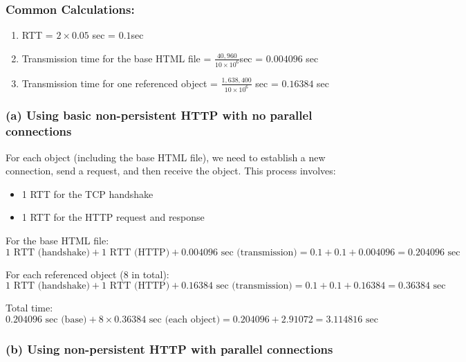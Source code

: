 \documentclass[
]{article}
\providecommand{\tightlist}{%
  \setlength{\itemsep}{0pt}\setlength{\parskip}{0pt}}
\begin{document}
\hypertarget{common-calculations}{%
\subsubsection{Common Calculations:}\label{common-calculations}}

\begin{enumerate}
\def\labelenumi{\arabic{enumi}.}
\tightlist
\item
  RTT = \(2 \times 0.05\) sec = \(0.1\)sec
\item
  Transmission time for the base HTML file =
  \(\frac{40,960}{10 \times 10^6}\)sec = \(0.004096\) sec
\item
  Transmission time for one referenced object =
  \(\frac{1,638,400}{10 \times 10^6}\) sec = \(0.16384\) sec
\end{enumerate}

\hypertarget{a-using-basic-non-persistent-http-with-no-parallel-connections}{%
\subsubsection{(a) Using basic non-persistent HTTP with no parallel
connections}\label{a-using-basic-non-persistent-http-with-no-parallel-connections}}

For each object (including the base HTML file), we need to establish a
new connection, send a request, and then receive the object. This
process involves:

\begin{itemize}
\tightlist
\item
  1 RTT for the TCP handshake
\item
  1 RTT for the HTTP request and response
\end{itemize}

For the base HTML file: \[
1 \text{ RTT (handshake)} + 1 \text{ RTT (HTTP)} + 0.004096 \text{ sec (transmission)}
= 0.1 + 0.1 + 0.004096 = 0.204096 \text{ sec}
\]

For each referenced object (8 in total): \[
1 \text{ RTT (handshake)} + 1 \text{ RTT (HTTP)} + 0.16384 \text{ sec (transmission)}= 0.1 + 0.1 + 0.16384 = 0.36384 \text{ sec}
\]

Total time: \[
0.204096 \text{ sec (base)} + 8 \times 0.36384 \text{ sec (each object)} = 0.204096 + 2.91072 = 3.114816 \text{ sec}
\]

\hypertarget{b-using-non-persistent-http-with-parallel-connections}{%
\subsubsection{(b) Using non-persistent HTTP with parallel
connections}\label{b-using-non-persistent-http-with-parallel-connections}}
\end{document}
